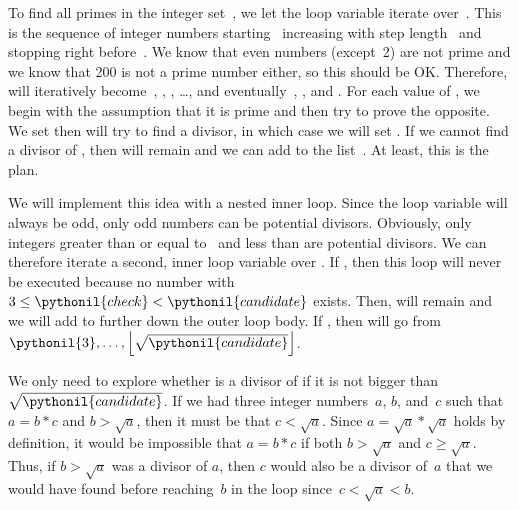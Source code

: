 %
\begin{sloppypar}%
To find all primes in the integer set~, we let the loop variable  iterate over~.
This is the sequence of integer numbers starting~ increasing with step length~ and stopping right before~.
We know that even numbers (except~2) are not prime and we know that 200 is not a prime number either, so this should be OK.
Therefore,  will iteratively become~, , , \dots, and eventually~, , and .
For each value of , we begin with the assumption that it is prime and then try to prove the opposite.
We set  then will try to find a divisor, in which case we will set .
If we cannot find a divisor of , then  will remain  and we can add  to the list~.
At least, this is the plan.%
\end{sloppypar}%
%
We will implement this idea with a nested inner loop.
Since the loop variable  will always be odd, only odd numbers can be potential divisors.
Obviously, only integers greater than or equal to~ and less than  are potential divisors.
We can therefore iterate a second, inner loop variable  over .
If , then this loop will never be executed because no number  with $3\leq\pythonil{check}<\pythonil{candidate}$ exists.
Then,  will remain  and we will add  to  further down the outer loop body.
If , then  will go from $\pythonil{3}, \dots, \left\lfloor\sqrt{\pythonil{candidate}}\right\rfloor$.

We only need to explore whether  is a divisor of  if it is not bigger than $\sqrt{\pythonil{candidate}}$.
If we had three integer numbers~$a$, $b$, and~$c$ such that $a=b*c$ and $b>\sqrt{a}$, then it must be that $c<\sqrt{a}$.
Since $a=\sqrt{a}*\sqrt{a}$ holds by definition, it would be impossible that $a=b*c$ if both $b>\sqrt{a}$ and $c\geq\sqrt{a}$.
Thus, if $b>\sqrt{a}$ was a divisor of $a$, then $c$ would also be a divisor of~$a$ that we would have found before reaching~$b$ in the loop since~$c<\sqrt{a}<b$.

